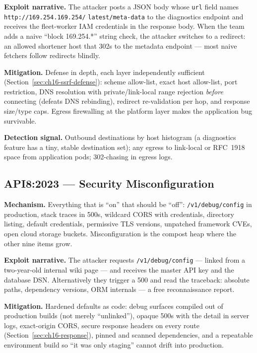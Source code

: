 \textbf{Exploit narrative.} The attacker posts a JSON body whose
\texttt{url} field names \texttt{http://169.254.169.254/}\allowbreak
\texttt{latest/meta-data} to the diagnostics endpoint and receives the
fleet-worker IAM credentials in the response body. When the team adds a naive ``block 169.254.*'' string check,
the attacker switches to a redirect: an allowed shortener host that 302s to
the metadata endpoint --- most naive fetchers follow redirects blindly.

\textbf{Mitigation.} Defense in depth, each layer independently sufficient
(Section~\ref{sec:ch16-ssrf-defense}): scheme allow-list, exact host
allow-list, port restriction, DNS resolution with private/link-local range
rejection \emph{before} connecting (defeats DNS rebinding), redirect
re-validation per hop, and response size/type caps. Egress firewalling at
the platform layer makes the application bug survivable.

\textbf{Detection signal.} Outbound destinations by host histogram (a
diagnostics feature has a tiny, stable destination set); any egress to
link-local or RFC~1918 space from application pods; 302-chasing in egress
logs.

\subsection{API8:2023 --- Security Misconfiguration}
\label{sec:ch16-api8}

\textbf{Mechanism.} Everything that is ``on'' that should be ``off'':
\texttt{/v1/debug/config} in production, stack traces in 500s, wildcard
CORS with credentials, directory listing, default credentials, permissive
TLS versions, unpatched framework CVEs, open cloud storage buckets.
Misconfiguration is the compost heap where the other nine items grow.

\textbf{Exploit narrative.} The attacker requests \texttt{/v1/debug/config}
--- linked from a two-year-old internal wiki page --- and receives the
master API key and the database DSN. Alternatively they trigger a 500 and
read the traceback: absolute paths, dependency versions, ORM internals ---
a free reconnaissance report.

\textbf{Mitigation.} Hardened defaults as code: debug surfaces compiled out
of production builds (not merely ``unlinked''), opaque 500s with the detail
in server logs, exact-origin CORS, secure response headers on every route
(Section~\ref{sec:ch16-response}), pinned and scanned dependencies, and a
repeatable environment build so ``it was only staging'' cannot drift into
production.

